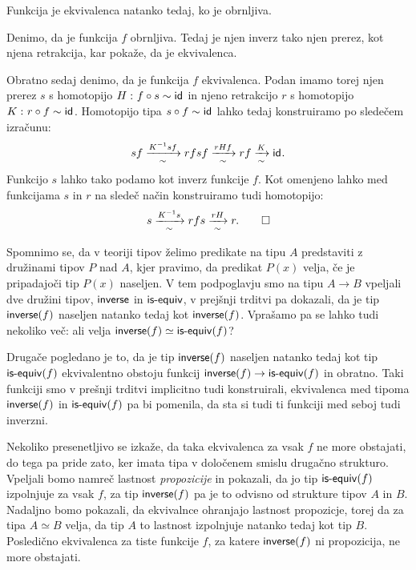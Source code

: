 \begin{trditev}
  \label{inv-of-equiv}
  Funkcija je ekvivalenca natanko tedaj, ko je obrnljiva.
\end{trditev}

\begin{dokaz}
  Denimo, da je funkcija \(f\) obrnljiva. Tedaj je njen inverz tako njen prerez, kot njena retrakcija, kar pokaže, da je ekvivalenca.

  Obratno sedaj denimo, da je funkcija \(f\) ekvivalenca. Podan imamo torej njen prerez
  \(s\) s homotopijo \(H \,\colon f \circ s \sim \textnormal{\textsf{id}}_{}\) in njeno retrakcijo \(r\) s homotopijo
  \(K \,\colon r \circ f \sim \textnormal{\textsf{id}}_{}\). Homotopijo tipa \(s \circ f \sim \textnormal{\textsf{id}}_{}\) lahko tedaj konstruiramo
  po sledečem izračunu:
  \[s f \xrightarrow[\sim]{K^{-1}sf} r f s f \xrightarrow[\sim]{rHf} r f \xrightarrow[\sim]{K} \textnormal{\textsf{id}}_{}.\]
  Funkcijo \(s\) lahko tako podamo kot inverz funkcije \(f\).
  Kot omenjeno lahko med funkcijama \(s\) in \(r\) na sledeč način konstruiramo tudi homotopijo:
  \[s \xrightarrow[\sim]{K^{-1}s} rfs \xrightarrow[\sim]{rH} r. \qedhere\]
\end{dokaz}

Spomnimo se, da v teoriji tipov želimo predikate na tipu \(A\) predstaviti z družinami tipov \(P\) nad \(A\), kjer pravimo, da predikat \(P(x)\) velja, če je pripadajoči tip \(P(x)\) naseljen. V tem podpoglavju smo na tipu \(A \to B\) vpeljali dve družini tipov, \(\textnormal{\textsf{inverse}}\) in \(\textnormal{\textsf{is-equiv}}\), v prejšnji trditvi pa dokazali, da je tip \(\textnormal{\textsf{inverse}}(f)\) naseljen natanko tedaj kot \(\textnormal{\textsf{inverse}}(f)\). Vprašamo pa se lahko tudi nekoliko več: ali velja \(\textnormal{\textsf{inverse}}(f) \simeq \textnormal{\textsf{is-equiv}}(f)\)?

Drugače pogledano je to, da je tip \(\textnormal{\textsf{inverse}}(f)\) naseljen natanko tedaj kot tip \(\textnormal{\textsf{is-equiv}}(f)\) ekvivalentno obstoju funkcij \(\textnormal{\textsf{inverse}}(f) \to \textnormal{\textsf{is-equiv}}(f)\) in obratno. Taki funkciji smo v prešnji trditvi implicitno tudi konstruirali, ekvivalenca med tipoma \(\textnormal{\textsf{inverse}}(f)\) in \(\textnormal{\textsf{is-equiv}}(f)\) pa bi pomenila, da sta si tudi ti funkciji med seboj tudi inverzni.

Nekoliko presenetljivo se izkaže, da taka ekvivalenca za vsak \(f\) ne more obstajati, do tega pa pride zato, ker imata tipa v določenem smislu drugačno strukturo. Vpeljali bomo namreč lastnost \emph{propozicije} in pokazali, da jo tip \(\textnormal{\textsf{is-equiv}}(f)\) izpolnjuje za vsak \(f\), za tip \(\textnormal{\textsf{inverse}}(f)\) pa je to odvisno od strukture tipov \(A\) in \(B\). Nadaljno bomo pokazali, da ekvivalnce ohranjajo lastnost propozicje, torej da za tipa \(A \simeq B\) velja, da tip \(A\) to lastnost izpolnjuje natanko tedaj kot tip \(B\). Posledično ekvivalenca za tiste funkcije \(f\), za katere \(\textnormal{\textsf{inverse}}(f)\) ni propozicija, ne more obstajati.

